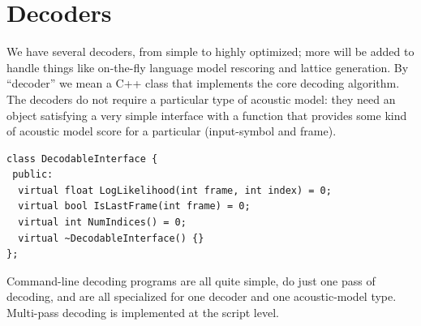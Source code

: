\documentclass[10pt,conference,letterpaper]{IEEEtran}
\begin{document}



\section{Decoders}
\label{sec:decoder}
We have several decoders, from simple to highly optimized; more will be added 
to handle things like on-the-fly language model rescoring and lattice 
generation.  By ``decoder'' we mean a C++ class that implements the core 
decoding algorithm.  The decoders do not require a particular type of acoustic 
model: they need an object satisfying a very simple interface with a function 
that provides some kind of acoustic model score for a particular (input-symbol 
and frame).  

{\scriptsize
\begin{verbatim}
class DecodableInterface {
 public:
  virtual float LogLikelihood(int frame, int index) = 0;
  virtual bool IsLastFrame(int frame) = 0;
  virtual int NumIndices() = 0;
  virtual ~DecodableInterface() {}
};
\end{verbatim}}

Command-line decoding programs are all quite simple, do just one 
pass of decoding, and are all specialized for one decoder and one 
acoustic-model type.  Multi-pass decoding is implemented at the script level.



\end{document}
